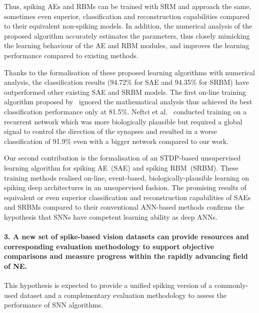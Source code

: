 Thus, spiking AEs and RBMs can be trained with SRM and approach the same, sometimes even superior, classification and reconstruction capabilities compared to their equivalent non-spiking models.
In addition, the numerical analysis of the proposed algorithm accurately estimates the parameters, thus closely mimicking the learning behaviour of the AE and RBM modules, and improves the learning performance compared to existing methods.






Thanks to the formalisation of these proposed learning algorithms with numerical analysis, the classification results (94.72\% for SAE and 94.35\% for SRBM) have outperformed other existing SAE and SRBM models.
The first on-line training algorithm proposed by~\citet{neil2013online} ignored the mathematical analysis thus achieved its best classification performance only at 81.5\%.
Neftci et al.~\citet{neftci2013event} conducted training on a recurrent network which was more biologically plausible but required a global signal to control the direction of the synapses and resulted in a worse classification of 91.9\% even with a bigger network compared to our work.

Our second contribution is the formalisation of an STDP-based unsupervised learning algorithm for spiking AE~(SAE) and spiking RBM~(SRBM).
These training methods realised on-line, event-based, biologically-plausible learning on spiking deep architectures in an unsupervised fashion.
The promising results of equivalent or even superior classification and reconstruction capabilities of SAEs and SRBMs compared to their conventional ANN-based methods confirms the hypothesis that SNNs have competent learning ability as deep ANNs.

\paragraph{3. A new set of spike-based vision datasets can provide resources and corresponding evaluation methodology to support objective comparisons and measure progress within the rapidly advancing field of NE.}
This hypothesis is expected to provide a unified spiking version of a commonly-used dataset and a complementary evaluation methodology to assess the performance of SNN algorithms.

